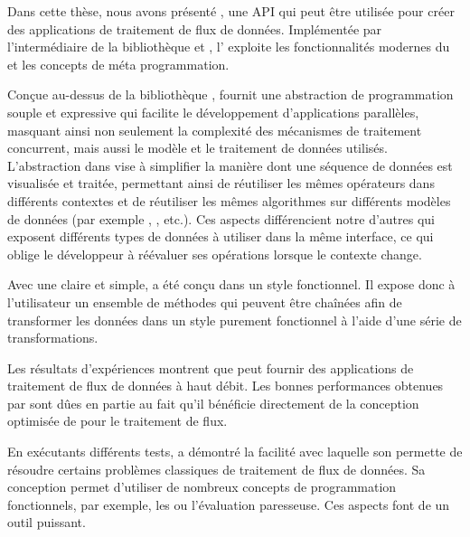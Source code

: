 
\begin{conclusion}
\label{conclusion.chap}

Dans cette th\`ese, nous avons pr\'esent\'e , une API qui peut \^etre utilis\'ee pour cr\'eer des applications de traitement de flux de donn\'ees. Impl\'ement\'ee par l'interm\'ediaire de la biblioth\`eque  et , l' exploite les fonctionnalit\'es modernes du  et les concepts de m\'eta programmation.

Con\c cue au-dessus de la biblioth\`eque ,  fournit une abstraction de programmation souple et expressive qui facilite le d\'eveloppement d'applications parall\`eles, masquant ainsi non seulement la complexit\'e des m\'ecanismes de traitement concurrent, mais aussi le mod\`ele et le traitement de donn\'ees utilis\'es. L'abstraction dans  vise \`a simplifier la mani\`ere dont une s\'equence de donn\'ees est visualis\'ee et trait\'ee, permettant ainsi de r\'eutiliser les m\^emes op\'erateurs dans diff\'erents contextes et de r\'eutiliser les m\^emes algorithmes sur diff\'erents mod\`eles de donn\'ees (par exemple , ,  etc.). Ces aspects diff\'erencient notre  d'autres  qui exposent diff\'erents types de donn\'ees \`a utiliser dans la m\^eme interface, ce qui oblige le d\'eveloppeur \`a r\'e\'evaluer ses op\'erations lorsque le contexte change.

Avec une  claire et simple,  a \'et\'e con\c cu dans un style fonctionnel. Il expose donc \`a l'utilisateur un ensemble de m\'ethodes qui peuvent \^etre cha\^in\'ees afin de transformer les donn\'ees dans un style purement fonctionnel \`a l'aide d'une s\'erie de transformations.


Les r\'esultats d'exp\'eriences montrent que  peut fournir des applications de traitement de flux de donn\'ees \`a haut d\'ebit. Les bonnes performances obtenues par  sont d\^ues en partie au fait qu'il b\'en\'eficie directement de la conception optimis\'ee de  pour le traitement de flux.

En ex\'ecutants diff\'erents tests,  a d\'emontr\'e la facilit\'e avec laquelle son  permette de r\'esoudre certains probl\`emes classiques de traitement de flux de donn\'ees. Sa conception permet d'utiliser de nombreux concepts de programmation fonctionnels, par exemple, les  ou l'\'evaluation paresseuse. Ces aspects font de  un outil puissant.


\end{conclusion}
